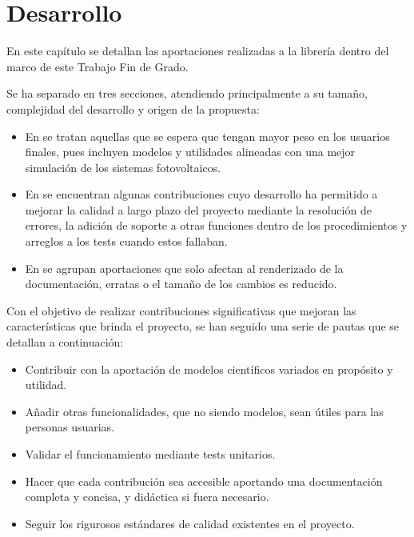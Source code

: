 \chapter{Desarrollo} \label{chp:desarrollo}

En este capítulo se detallan las aportaciones realizadas a la librería \pvlibpy{} dentro del marco de este Trabajo Fin de Grado.

Se ha separado en tres secciones, atendiendo principalmente a su tamaño, complejidad del desarrollo y origen de la propuesta:

\begin{itemize}
    \item En  se tratan aquellas que se espera que tengan mayor peso en los usuarios finales, pues incluyen modelos y utilidades alineadas con una mejor simulación de los sistemas fotovoltaicos.
    \item En  se encuentran algunas contribuciones cuyo desarrollo ha permitido a mejorar la calidad a largo plazo del proyecto mediante la resolución de errores, la adición de soporte a otras funciones dentro de los procedimientos y arreglos a los tests cuando estos fallaban.
    \item En  se agrupan aportaciones que solo afectan al renderizado de la documentación, erratas o el tamaño de los cambios es reducido.
\end{itemize}

Con el objetivo de realizar contribuciones significativas que mejoran las características que brinda el proyecto, se han seguido una serie de pautas que se detallan a continuación:

\begin{itemize}
    \item Contribuir con la aportación de modelos científicos variados en propósito y utilidad.

    \item Añadir otras funcionalidades, que no siendo modelos, sean útiles para las personas usuarias.

    \item Validar el funcionamiento mediante tests unitarios.

    \item Hacer que cada contribución sea accesible aportando una \gls{documentación} completa y concisa, y didáctica si fuera necesario.

    \item Seguir los rigurosos estándares de calidad existentes en el proyecto.
\end{itemize}

